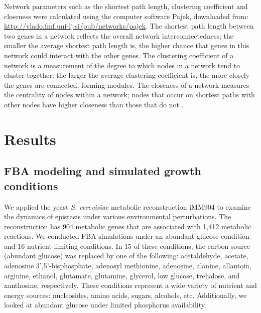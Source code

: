 \documentclass[10pt]{article}
\newcommand{\citep}{\cite}
\begin{document}
Network parameters such as the shortest path length, clustering
coefficient and closeness were calculated using the computer software
Pajek, downloaded from:
\url{http://vlado.fmf.uni-lj.si/pub/networks/pajek}. The shortest path
length between two genes in a network reflects the overall network
interconnectedness; the smaller the average shortest path length is,
the higher chance that genes in this network could interact with the
other genes. The clustering coefficient of a network is a measurement
of the degree to which nodes in a network tend to cluster together;
the larger the average clustering coefficient is, the more closely the
genes are connected, forming modules. The closeness of a network
measures the centrality of nodes within a network; nodes that occur on
shortest paths with other nodes have higher closeness than those that
do not \citep{Barabasi2004}.

\section*{Results}


\subsection*{FBA modeling and simulated growth conditions}

We applied the yeast \textit{S. cerevisiae} metabolic reconstruction
iMM904 \citep{Mo2009} to examine the dynamics of epistasis under various
environmental perturbations. The reconstruction has 904 metabolic
genes that are associated with 1,412 metabolic reactions. We conducted
FBA simulations under an abundant-glucose condition and 16
nutrient-limiting conditions. In 15 of these conditions, the carbon source
(abundant glucose) was replaced by one of the following: acetaldehyde,
acetate, adenosine 3',5'-bisphosphate, adenosyl methionine, adenosine,
alanine, allantoin, arginine, ethanol, glutamate, glutamine, glycerol,
low glucose, trehalose, and xanthosine, respectively. These conditions
represent a wide variety of nutrient and energy sources: nucleosides,
amino acids, sugars, alcohols, etc. Additionally, we looked at
abundant glucose under limited phosphorus availability.
\end{document}

